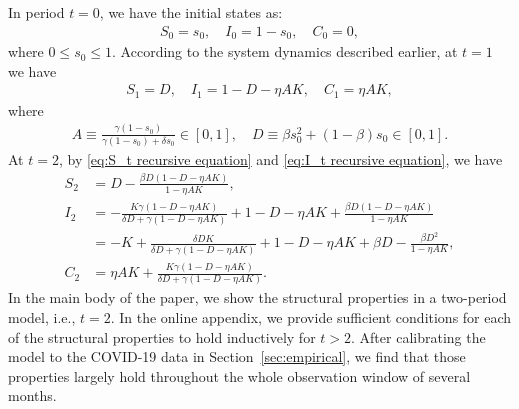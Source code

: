 \documentclass[nonblindrev, copyedit]{informs3a}
\newcounter{prop}[chapter]
\begin{document}
In period $t=0$, we have the initial states as:
\begin{align*}
S_0=s_0,\quad
I_0=1-s_0,\quad
C_0=0,
\end{align*}
where $0\le s_0\le1$. According to the system dynamics described earlier, at $t=1$ we have
\begin{align*}
S_1=D,\quad
I_1=1-D-\eta AK,\quad
C_1=\eta AK,
\end{align*}
where
\begin{align}\label{eq:AD-def}
   A\equiv\frac{\gamma(1-s_0)}{\gamma(1-s_0)+\delta s_0}\in[0,1],\quad D\equiv\beta s_0^2+(1-\beta)s_0\in [0,1].
\end{align}
At $t=2$, by \eqref{eq:S_t recursive equation} and \eqref{eq:I_t recursive equation}, we have
\begin{align*}
S_2&=D-\frac{\beta D(1-D-\eta AK)}{1-\eta AK},\\
I_2&=-\frac{K\gamma(1-D-\eta AK)}{\delta D+\gamma(1-D-\eta AK)}+1-D-\eta AK+\frac{\beta D(1-D-\eta AK)}{1-\eta AK}\\
&=-K+\frac{\delta DK}{\delta D+\gamma(1-D-\eta AK)}+1-D-\eta AK+\beta D-\frac{\beta D^2}{1-\eta AK},\\
C_2&=\eta AK+\frac{K\gamma(1-D-\eta AK)}{\delta D+\gamma(1-D-\eta AK)}.
\end{align*}
In the main body of the paper, we show the structural properties in a two-period model, i.e., $t=2$. In the online appendix, we provide sufficient conditions for each of the structural properties to hold inductively for $t> 2$. After calibrating the model to the COVID-19 data in Section~\ref{sec:empirical}, we find that those properties largely hold throughout the whole observation window of several months.
\end{document}
